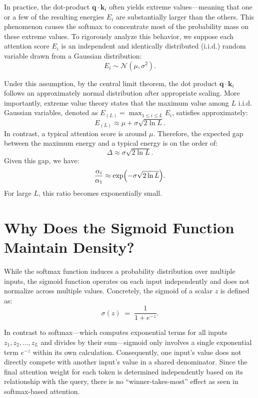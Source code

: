 In practice, the dot-product $\boldsymbol{q} \cdot \boldsymbol{k}_i$ often yields extreme values—meaning that one or a few of the resulting energies $E_i$ are substantially larger than the others. This phenomenon causes the softmax to concentrate most of the probability mass on these extreme values. To rigorously analyze this behavior, we suppose each attention score $E_i$ is an independent and identically distributed (i.i.d.) random variable drawn from a Gaussian distribution:
\begin{equation}
E_i \sim \mathcal{N}(\mu, \sigma^2).
\end{equation}

Under this assumption, by the central limit theorem, the dot product $\boldsymbol{q}\cdot \boldsymbol{k}_i$ follows an approximately normal distribution after appropriate scaling. More importantly, extreme value theory states that the maximum value among $L$ i.i.d. Gaussian variables, denoted as $E_{(L)} = \max_{1 \le i \le L} E_i$, satisfies approximately: 
\begin{equation}
E_{(L)} \approx \mu + \sigma \sqrt{2 \ln L}.
\end{equation}
In contrast, a typical attention score is around $\mu$. Therefore, the expected gap between the maximum energy and a typical energy is on the order of: 
\begin{equation}
\Delta \approx \sigma \sqrt{2 \ln L}.
\end{equation}
Given this gap, we have:
\begin{equation}
\frac{\alpha_i}{\alpha_1} \approx \exp\Bigl(-\sigma \sqrt{2 \ln L}\Bigr). 
\end{equation}
For large $L$, this ratio becomes exponentially small.



\section{Why Does the Sigmoid Function Maintain Density?}
\label{app:density}

While the softmax function induces a probability distribution over multiple inputs, the sigmoid function operates on each input independently and does not normalize across multiple values. Concretely, the sigmoid of a scalar $z$ is defined as:
\begin{equation}
\sigma(z) \;=\; \frac{1}{1 + e^{-z}}.
\end{equation}

In contrast to softmax—which computes exponential terms for all inputs $z_1, z_2, \dots, z_L$ and divides by their sum—sigmoid only involves a single exponential term $e^{-z}$ within its own calculation. Consequently, one input's value does not directly compete with another input's value in a shared denominator. Since the final attention weight for each token is determined independently based on its relationship with the query, there is no ``winner-takes-most'' effect as seen in softmax-based attention.

